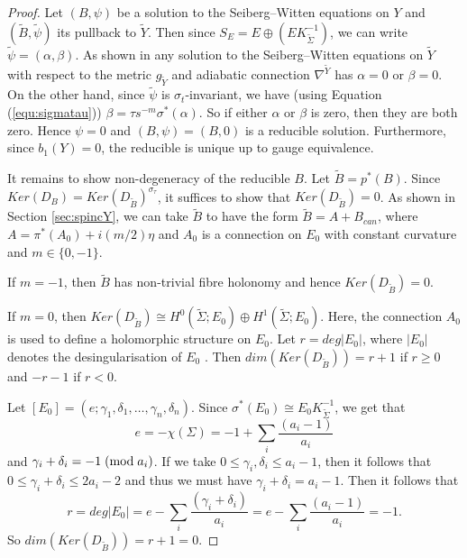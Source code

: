 \documentclass{amsart}
\theoremstyle{definition}
\theoremstyle{remark}
\numberwithin{equation}{section}
\begin{document}
\begin{proof}
Let $(B , \psi)$ be a solution to the Seiberg--Witten equations on $Y$ and $(\widetilde{B} , \widetilde{\psi})$ its pullback to $\widetilde{Y}$. Then since $S_E = E \oplus (E K_{\widetilde{\Sigma}}^{-1})$, we can write $\widetilde{\psi} = (\alpha , \beta)$. As shown in \cite{moy} any solution to the Seiberg--Witten equations on $\widetilde{Y}$ with respect to the metric $g_{\widetilde{Y}}$ and adiabatic connection $\nabla^{\widetilde{Y}}$ has $\alpha = 0$ or $\beta = 0$. On the other hand, since $\widetilde{\psi}$ is $\sigma_t$-invariant, we have (using Equation (\ref{equ:sigmatau})) $\beta = \tau s^{-m} \sigma^*(\alpha)$. So if either $\alpha$ or $\beta$ is zero, then they are both zero. Hence $\psi = 0$ and $(B , \psi) = (B , 0)$ is a reducible solution. Furthermore, since $b_1(Y) = 0$, the reducible is unique up to gauge equivalence.

It remains to show non-degeneracy of the reducible $B$. Let $\widetilde{B} = p^*(B)$. Since $Ker(D_B) = Ker(D_{\widetilde{B}})^{\sigma_\tau}$, it suffices to show that $Ker(D_{\widetilde{B}}) = 0$. As shown in Section \ref{sec:spincY}, we can take $\widetilde{B}$ to have the form $\widetilde{B} = A + B_{can}$, where $A = \pi^*(A_0) + i(m/2)\eta$ and $A_0$ is a connection on $E_0$ with constant curvature and $m \in \{0,-1\}$.

If $m=-1$, then $\widetilde{B}$ has non-trivial fibre holonomy and hence $Ker(D_{\widetilde{B}}) = 0$.

If $m=0$, then $Ker(D_{\widetilde{B}}) \cong H^0(\widetilde{\Sigma} ; E_0 ) \oplus H^1( \widetilde{\Sigma} ; E_0)$. Here, the connection $A_0$ is used to define a holomorphic structure on $E_0$. Let $r = deg|E_0|$, where $|E_0|$ denotes the desingularisation of $E_0$ \cite[Definition 2.0.2]{moy}. Then $dim( Ker(D_{\widetilde{B}}) ) = r+1$ if $r \ge 0$ and $-r-1$ if $r < 0$.

Let $[E_0] = ( e ; \gamma_1 , \delta_1 , \dots , \gamma_n , \delta_n )$. Since $\sigma^*(E_0) \cong E_0 K_{\widetilde{\Sigma}}^{-1}$, we get that 
\[
e = -\chi(\Sigma) = -1 + \sum_i \frac{(a_i - 1)}{a_i}
\] 
and $\gamma_i + \delta_i = -1 \; ({\rm mod} \; a_i)$. If we take $0 \le \gamma_i ,\delta_i \le a_i - 1$, then it follows that $0 \le \gamma_i + \delta_i \le 2a_i - 2$ and thus we must have $\gamma_i + \delta_i = a_i - 1$. Then it follows that 
\[
r = deg|E_0| = e - \sum_i \frac{(\gamma_i + \delta_i)}{a_i} = e - \sum_i \frac{ (a_i-1)}{a_i} = -1.
\]
So $dim( Ker(D_{\widetilde{B}}) ) = r+1 = 0$.

\end{proof}
\end{document}
